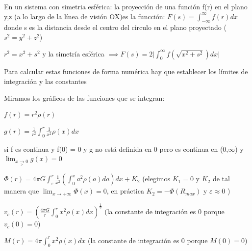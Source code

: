\documentclass[12pt]{book}
\begin{document}
\begin{description}
\item En un sistema con simetria esférica: la proyección de una función f(r) en el plano y,z (a lo largo de la línea de visión OX)es la funcción: 
$F(s) = \int_{-\infty}^\infty{f(r)dx}$ donde s es la distancia desde el centro del circulo en el plano proyectado ($s^2 = y^2 + z^2$)
\item $r^2 = x^2 + s^2$ y la simetría esférica $ \implies  F(s) =  2\lvert \int_0^\infty{f(\sqrt{x^2+s^2})dx} \rvert  $


\item Para calcular estas funciones de forma numérica hay que establecer los límites de integración y las constantes
\item Miramos los gráficos de las funciones que se integran:

\item $ f(r) = r^2 \rho(r)$
\item $g(r) = \frac{1}{r^2}  \int_0^r{\frac{1}{x^2} \rho(x) dx }$
\item si  f es  continua y f(0) = 0 y g no está definida en 0 pero es continua en (0,$\infty$) y $  \lim_{x \underset{>}{\to} 0} g(x) = 0$
\item $\Phi(r) = 4 \pi G  \int_\varepsilon^r{ \frac{1}{x^2}(\int_0^x{a^2 \rho(a)da})dx} + K_2$
(elegimos $K_1 = 0$ y $K_2$  de tal manera que $\lim_{x \to +\infty}\Phi(x) = 0 $, en práctica $K_2 = -\Phi(R_{max})$  y $\varepsilon \approx 0$ ) 
\item $v_c(r) = (\frac{4 \pi G }{r}\int_0^r{x^2 \rho(x)dx} )^{\frac{1}{2}}  $ (la constante de integración es 0 porque $v_c(0) = 0$)
\item $M(r) = 4 \pi \int_0^r{x^2 \rho(x)dx}$ (la constante de integración es 0 porque $M(0) = 0$) 
\end{description}
\end{document}
